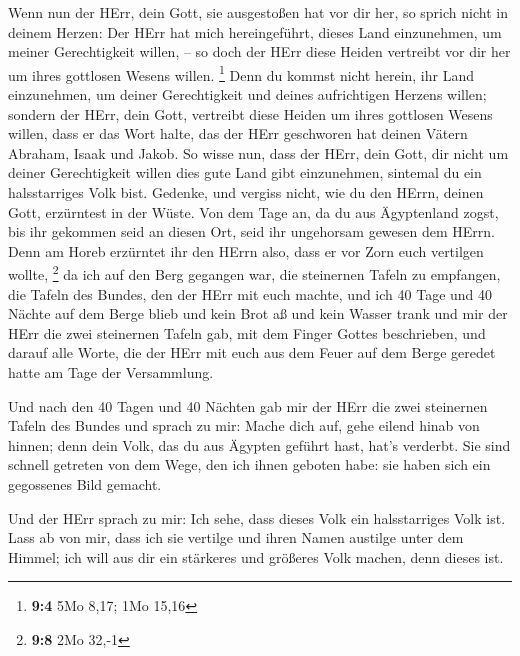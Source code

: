  Wenn nun der HErr, dein Gott, sie ausgestoßen hat vor dir
her, so sprich nicht in deinem Herzen: Der HErr hat mich hereingeführt,
dieses Land einzunehmen, um meiner Gerechtigkeit willen, -- so doch der
HErr diese Heiden vertreibt vor dir her um ihres gottlosen Wesens
willen. \footnote{\textbf{9:4} 5Mo 8,17; 1Mo 15,16}  Denn du
kommst nicht herein, ihr Land einzunehmen, um deiner Gerechtigkeit und
deines aufrichtigen Herzens willen; sondern der HErr, dein Gott,
vertreibt diese Heiden um ihres gottlosen Wesens willen, dass er das
Wort halte, das der HErr geschworen hat deinen Vätern Abraham, Isaak und
Jakob.  So wisse nun, dass der HErr, dein Gott, dir nicht um
deiner Gerechtigkeit willen dies gute Land gibt einzunehmen, sintemal du
ein halsstarriges Volk bist.  Gedenke, und vergiss nicht,
wie du den HErrn, deinen Gott, erzürntest in der Wüste. Von dem Tage an,
da du aus Ägyptenland zogst, bis ihr gekommen seid an diesen Ort, seid
ihr ungehorsam gewesen dem HErrn.  Denn am Horeb erzürntet
ihr den HErrn also, dass er vor Zorn euch vertilgen wollte, \footnote{\textbf{9:8}
  2Mo 32,-1}  da ich auf den Berg gegangen war, die
steinernen Tafeln zu empfangen, die Tafeln des Bundes, den der HErr mit
euch machte, und ich 40 Tage und 40 Nächte auf dem Berge blieb und kein
Brot aß und kein Wasser trank  und mir der HErr die zwei
steinernen Tafeln gab, mit dem Finger Gottes beschrieben, und darauf
alle Worte, die der HErr mit euch aus dem Feuer auf dem Berge geredet
hatte am Tage der Versammlung.

 Und nach den 40 Tagen und 40 Nächten gab mir der HErr die
zwei steinernen Tafeln des Bundes  und sprach zu mir: Mache
dich auf, gehe eilend hinab von hinnen; denn dein Volk, das du aus
Ägypten geführt hast, hat's verderbt. Sie sind schnell getreten von dem
Wege, den ich ihnen geboten habe: sie haben sich ein gegossenes Bild
gemacht.

 Und der HErr sprach zu mir: Ich sehe, dass dieses Volk ein
halsstarriges Volk ist.  Lass ab von mir, dass ich sie
vertilge und ihren Namen austilge unter dem Himmel; ich will aus dir ein
stärkeres und größeres Volk machen, denn dieses ist.

